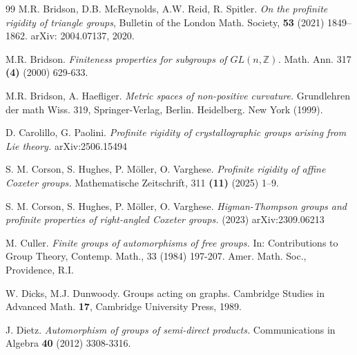 \documentclass[a4paper,12pt]{article}
\begin{document}
{\begin{thebibliography}{99}
 M.R. Bridson, D.B. McReynolds, A.W. Reid, R. Spitler. \textit{On the profinite rigidity of triangle groups}, Bulletin of the London Math. Society, {\bf 53} (2021) 1849--1862. arXiv: 2004.07137, 2020.



 M.R. Bridson. \textit{ Finiteness properties for subgroups of $GL(n, \mathbb{Z})$.} Math. Ann. 317 {\bf(4)} (2000) 629-633.

 M.R. Bridson, A. Haefliger. \textit{Metric spaces of non-positive curvature.} Grundlehren der math Wiss. 319, Springer-Verlag, Berlin. Heidelberg. New York (1999).


 D. Carolillo, G. Paolini. \textit{Profinite rigidity of crystallographic groups arising from Lie theory.} arXiv:2506.15494

 S. M. Corson, S. Hughes, P. M\"oller, O. Varghese. \textit{Profinite rigidity of affine Coxeter groups.} Mathematische Zeitschrift, 311 \textbf{(11)} (2025) 1--9. 

 S. M. Corson, S. Hughes, P. M\"oller, O. Varghese. \textit{Higman-Thompson groups and profinite properties
of right-angled Coxeter groups.} (2023) arXiv:2309.06213







 M. Culler. {\it Finite groups of automorphisms of free groups.} In: Contributions to Group Theory, Contemp. Math., 33 (1984) 197-207. Amer. Math. Soc., Providence, R.I.

 W. Dicks, M.J. Dunwoody. Groups acting on graphs. Cambridge Studies in Advanced Math. {\bf 17}, Cambridge University Press, 1989.

 J. Dietz. {\it Automorphism of groups of semi-direct products.}  Communications in Algebra {\bf 40} (2012) 3308-3316.  


\end{thebibliography}}
\end{document}
